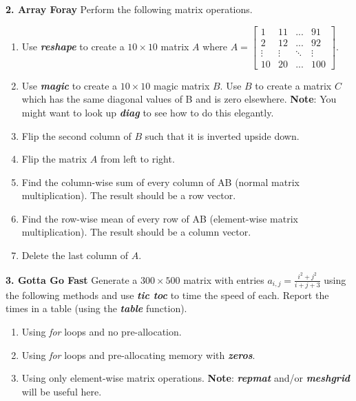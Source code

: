 \documentclass[11pt]{article}
\newenvironment{qparts}{\begin{enumerate}[{(}a{)}]}{\end{enumerate}}
\begin{document}
\noindent
\newline
\textbf{2. Array Foray} Perform the following matrix operations. 
\begin{qparts}
    \item Use \textbf{\textit{reshape}} to create a $10 \times 10$ matrix $A$ where 
    $A = \begin{bmatrix}1 &11 & ...& 91\\ 2&12&...&92\\ \vdots&\vdots&\ddots&\vdots\\ 10&20&...&100\end{bmatrix}$.

    \item Use \textbf{\textit{magic}} to create a $10 \times 10$ magic matrix $B$. 
    Use $B$ to create a matrix $C$ which has the same diagonal values of B and is zero elsewhere. 
    \textbf{Note}: You might want to look up \textbf{\textit{diag}} to see how to do this elegantly. 

    \item Flip the second column of $B$ such that it is inverted upside down.

    \item Flip the matrix $A$ from left to right.

    \item Find the column-wise sum of every column of AB (normal matrix multiplication).
    The result should be a row vector.

    \item Find the row-wise mean of every row of AB (element-wise matrix multiplication).
    The result should be a column vector.

    \item Delete the last column of $A$. 
\end{qparts}

\noindent
\newline
\textbf{3. Gotta Go Fast}
Generate a $300 \times 500$ matrix with entries $a_{i,j} = \frac{i^2+j^2}{i+j+3} $
using the following methods and use \textbf{\textit{tic toc}} to time the speed of each.
Report the times in a table (using the \textbf{\textit{table}} function).

\begin{qparts}
    \item Using \textit{for} loops and no pre-allocation.

    \item Using \textit{for} loops and pre-allocating memory with \textbf{\textit{zeros}}.

    \item Using only element-wise matrix operations.
    \textbf{Note}: \textbf{\textit{repmat}} and/or \textbf{\textit{meshgrid}} will be useful here. 
\end{qparts}
\end{document}
